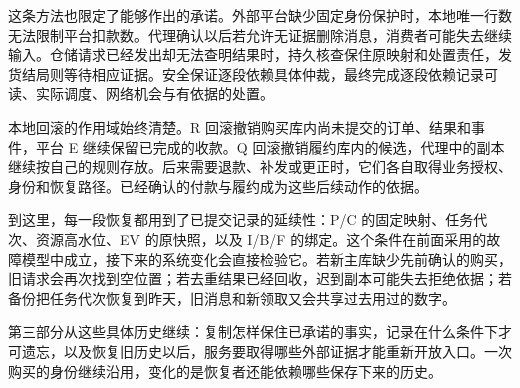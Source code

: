 这条方法也限定了能够作出的承诺。外部平台缺少固定身份保护时，本地唯一行数无法限制平台扣款数。代理确认以后若允许无证据删除消息，消费者可能失去继续输入。仓储请求已经发出却无法查明结果时，持久核查保住原映射和处置责任，发货结局则等待相应证据。安全保证逐段依赖具体仲裁，最终完成逐段依赖记录可读、实际调度、网络机会与有依据的处置。

本地回滚的作用域始终清楚。R 回滚撤销购买库内尚未提交的订单、结果和事件，平台 E 继续保留已完成的收款。Q 回滚撤销履约库内的候选，代理中的副本继续按自己的规则存放。后来需要退款、补发或更正时，它们各自取得业务授权、身份和恢复路径。已经确认的付款与履约成为这些后续动作的依据。

到这里，每一段恢复都用到了已提交记录的延续性：P/C 的固定映射、任务代次、资源高水位、EV 的原快照，以及 I/B/F 的绑定。这个条件在前面采用的故障模型中成立，接下来的系统变化会直接检验它。若新主库缺少先前确认的购买，旧请求会再次找到空位置；若去重结果已经回收，迟到副本可能失去拒绝依据；若备份把任务代次恢复到昨天，旧消息和新领取又会共享过去用过的数字。

第三部分从这些具体历史继续：复制怎样保住已承诺的事实，记录在什么条件下才可遗忘，以及恢复旧历史以后，服务要取得哪些外部证据才能重新开放入口。一次购买的身份继续沿用，变化的是恢复者还能依赖哪些保存下来的历史。

